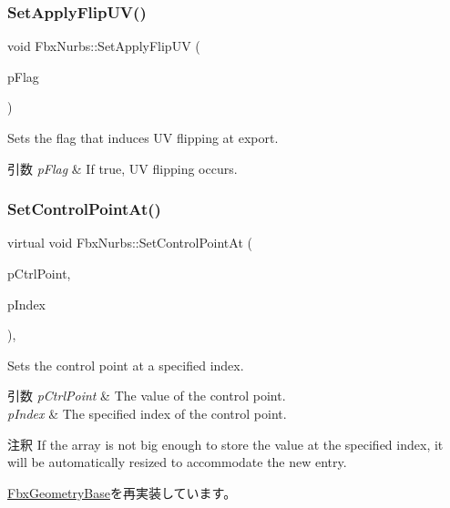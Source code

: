 \subsubsection{\texorpdfstring{Set\+Apply\+Flip\+U\+V()}{SetApplyFlipUV()}}
{\footnotesize\ttfamily void Fbx\+Nurbs\+::\+Set\+Apply\+Flip\+UV (\begin{DoxyParamCaption}\item[{bool}]{p\+Flag }\end{DoxyParamCaption})}

Sets the flag that induces UV flipping at export. 
\begin{DoxyParams}{引数}
{\em p\+Flag} & If {\ttfamily true}, UV flipping occurs. \\
\hline
\end{DoxyParams}
\mbox{\label{class_fbx_nurbs_a46f56bfb4c6ffc90b79b2e0b81c89880}} 
\subsubsection{\texorpdfstring{Set\+Control\+Point\+At()}{SetControlPointAt()}}
{\footnotesize\ttfamily virtual void Fbx\+Nurbs\+::\+Set\+Control\+Point\+At (\begin{DoxyParamCaption}\item[{const \hyperlink{class_fbx_vector4}{Fbx\+Vector4} \&}]{p\+Ctrl\+Point,  }\item[{int}]{p\+Index }\end{DoxyParamCaption})\hspace{0.3cm}{\ttfamily [inline]}, {\ttfamily [virtual]}}

Sets the control point at a specified index. 
\begin{DoxyParams}{引数}
{\em p\+Ctrl\+Point} & The value of the control point. \\
\hline
{\em p\+Index} & The specified index of the control point.\\
\hline
\end{DoxyParams}
\begin{DoxyRemark}{注釈}
If the array is not big enough to store the value at the specified index, it will be automatically resized to accommodate the new entry. 
\end{DoxyRemark}


\hyperlink{class_fbx_geometry_base_ab2d5567b073e6b9f4feb5bb428fa99e4}{Fbx\+Geometry\+Base}を再実装しています。



